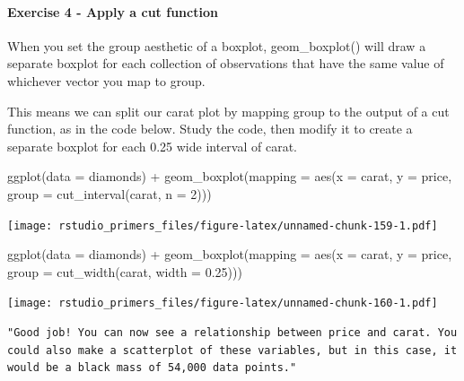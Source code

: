 \documentclass[
]{article}
\newenvironment{Shaded}{\begin{snugshade}}{\end{snugshade}}
\newcommand{\AttributeTok}[1]{\textcolor[rgb]{0.77,0.63,0.00}{#1}}
\newcommand{\DecValTok}[1]{\textcolor[rgb]{0.00,0.00,0.81}{#1}}
\newcommand{\FloatTok}[1]{\textcolor[rgb]{0.00,0.00,0.81}{#1}}
\newcommand{\FunctionTok}[1]{\textcolor[rgb]{0.00,0.00,0.00}{#1}}
\newcommand{\NormalTok}[1]{#1}
\newcommand{\SpecialCharTok}[1]{\textcolor[rgb]{0.00,0.00,0.00}{#1}}
\begin{document}
\hypertarget{exercise-4---apply-a-cut-function}{%
\paragraph{Exercise 4 - Apply a cut
function}\label{exercise-4---apply-a-cut-function}}

When you set the group aesthetic of a boxplot, geom\_boxplot() will draw
a separate boxplot for each collection of observations that have the
same value of whichever vector you map to group.

This means we can split our carat plot by mapping group to the output of
a cut function, as in the code below. Study the code, then modify it to
create a separate boxplot for each 0.25 wide interval of carat.

\begin{Shaded}
\begin{Highlighting}[]
\FunctionTok{ggplot}\NormalTok{(}\AttributeTok{data =}\NormalTok{ diamonds) }\SpecialCharTok{+}
  \FunctionTok{geom\_boxplot}\NormalTok{(}\AttributeTok{mapping =} \FunctionTok{aes}\NormalTok{(}\AttributeTok{x =}\NormalTok{ carat, }\AttributeTok{y =}\NormalTok{ price, }\AttributeTok{group =} \FunctionTok{cut\_interval}\NormalTok{(carat, }\AttributeTok{n =} \DecValTok{2}\NormalTok{)))}
\end{Highlighting}
\end{Shaded}

\texttt{[image: rstudio\_primers\_files/figure-latex/unnamed-chunk-159-1.pdf]}

\begin{Shaded}
\begin{Highlighting}[]
\FunctionTok{ggplot}\NormalTok{(}\AttributeTok{data =}\NormalTok{ diamonds) }\SpecialCharTok{+}
  \FunctionTok{geom\_boxplot}\NormalTok{(}\AttributeTok{mapping =} \FunctionTok{aes}\NormalTok{(}\AttributeTok{x =}\NormalTok{ carat, }\AttributeTok{y =}\NormalTok{ price, }\AttributeTok{group =} \FunctionTok{cut\_width}\NormalTok{(carat, }\AttributeTok{width =} \FloatTok{0.25}\NormalTok{)))}
\end{Highlighting}
\end{Shaded}

\texttt{[image: rstudio\_primers\_files/figure-latex/unnamed-chunk-160-1.pdf]}

\begin{verbatim}
"Good job! You can now see a relationship between price and carat. You could also make a scatterplot of these variables, but in this case, it would be a black mass of 54,000 data points."
\end{verbatim}
\end{document}
